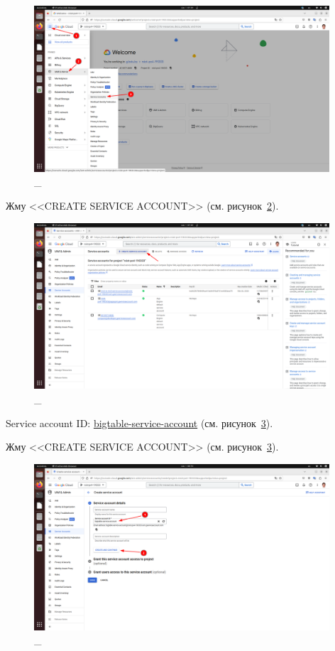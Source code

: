 \documentclass[12pt, a4paper, simple]{eskdtext}
\begin{document}
  \begin{figure}[!h]
    \centering
    \includegraphics[width=11cm]
    {images/GoogleCloudBigTable/2023-03-01_07-59-42.png}
    \caption{\_}
    \label{fig:9}
  \end{figure}

  Жму <<CREATE SERVICE ACCOUNT>> (см. рисунок~\ref{fig:10}).

  \begin{figure}[!h]
    \centering
    \includegraphics[width=11cm]
    {images/GoogleCloudBigTable/2023-03-01_08-00-04.png}
    \caption{\_}
    \label{fig:10}
  \end{figure}

  \newpage

  Service account ID: \underline{bigtable-service-account} (см. рисунок~\ref{fig:11}).

  Жму <<CREATE SERVICE ACCOUNT>> (см. рисунок~\ref{fig:11}).

  \begin{figure}[!h]
    \centering
    \includegraphics[width=11cm]
    {images/GoogleCloudBigTable/2023-03-01_08-10-44.png}
    \caption{\_}
    \label{fig:11}
  \end{figure}
\end{document}

